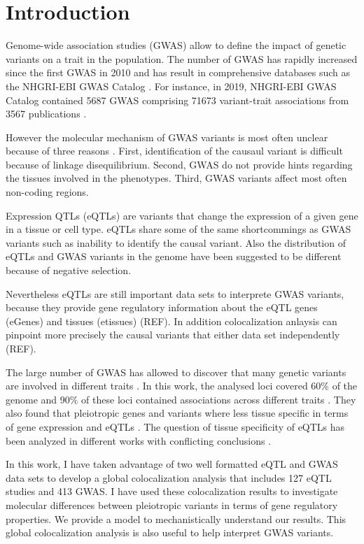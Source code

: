 \section*{Introduction}\label{sec:introduction}

Genome-wide association studies (GWAS) allow to define the impact of genetic variants on a trait in the population.
%
The number of GWAS has rapidly increased since the first GWAS in 2010 and has result in comprehensive databases such as the NHGRI-EBI GWAS Catalog \citep{2018.Parkinson.Buniello}.
%
For instance, in 2019, NHGRI-EBI GWAS Catalog contained 5687 GWAS comprising 71673 variant-trait associations from 3567 publications \citep{2018.Parkinson.Buniello}.

However the molecular mechanism of GWAS variants is most often unclear because of three reasons \citep{2020.Trynka.CanoGamez}.
%
First, identification of the causaul variant is difficult because of linkage disequilibrium.
%
Second, GWAS do not provide hints regarding the tissues involved in the phenotypes.
%
Third, GWAS variants affect most often non-coding regions.

Expression QTLs (eQTLs) are variants that change the expression of a given gene in a tissue or cell type.
%
eQTLs share some of the same shortcommings as GWAS variants such as inability to identify the causal variant.
%
Also the distribution of eQTLs and GWAS variants in the genome have been suggested to be different because of negative selection.

Nevertheless eQTLs are still important data sets to interprete GWAS variants, because they provide gene regulatory information about the eQTL genes (eGenes) and tissues (etissues) (REF).
%
In addition colocalization anlaysis can pinpoint more precisely the causal variants that either data set independently (REF).

The large number of GWAS has allowed to discover that many genetic variants are involved in different traits \citep{2019.Posthuma.Watanabe}.
%
In this work, the analysed loci covered 60\% of the genome and 90\% of these loci contained associations across different traits \citep{2019.Posthuma.Watanabe}.
%
They also found that pleiotropic genes and variants where less tissue specific in terms of gene expression and eQTLs \citep{2019.Posthuma.Watanabe}.
%
The question of tissue specificity of eQTLs has been analyzed in different works with conflicting conclusions \citep{2021.Li.Mu.GenomeBiology.impactcelltype,2018.Vijayanand.Schmiedel.Cell.ImpactGeneticPolymorphisms,2017...Nature.Geneticeffectsgene}.

In this work, I have taken advantage of two well formatted eQTL and GWAS data sets to develop a global colocalization analysis that includes 127 eQTL studies and 413 GWAS.
%
I have used these colocalization results to investigate molecular differences between pleiotropic variants in terms of gene regulatory properties.
%
We provide a model to mechanistically understand our results.
%
This global colocalization analysis is also useful to help interpret GWAS variants.
